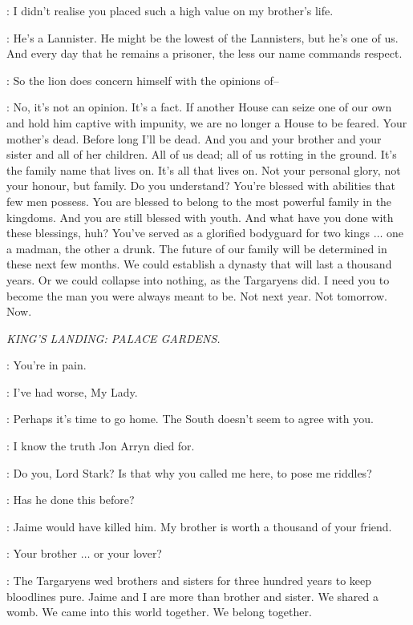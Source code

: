 \JAIME: I didn't realise you placed such a high value on my brother's life. 

\TYWIN: He's a Lannister. He might be the lowest of the Lannisters, but he's one of us. And every day that he remains a prisoner, the less our name commands respect. 

\JAIME: So the lion does concern himself with the opinions of-- 

\TYWIN: No, it's not an opinion. It's a fact. If another House can seize one of our own and hold him captive with impunity, we are no longer a House to be feared. Your mother's dead. Before long I'll be dead. And you and your brother and your sister and all of her children. All of us dead; all of us rotting in the ground. It's the family name that lives on. It's all that lives on. Not your personal glory, not your honour, but family. Do you understand? You're blessed with abilities that few men possess. You are blessed to belong to the most powerful family in the kingdoms. And you are still blessed with youth. And what have you done with these blessings, huh? You've served as a glorified bodyguard for two kings $\ldots$ one a madman, the other a drunk. The future of our family will be determined in these next few months. We could establish a dynasty that will last a thousand years. Or we could collapse into nothing, as the Targaryens did. I need you to become the man you were always meant to be. Not next year. Not tomorrow. Now. 


\scene

\textit{ KING'S LANDING: PALACE GARDENS.}


\CERSEI: You're in pain. 

\NED: I've had worse, My Lady. 

\CERSEI: Perhaps it's time to go home. The South doesn't seem to agree with you. 

\NED: I know the truth Jon Arryn died for. 

\CERSEI: Do you, Lord Stark? Is that why you called me here, to pose me riddles? 

\NED:  Has he done this before? 

\CERSEI: Jaime would have killed him. My brother is worth a thousand of your friend. 

\NED: Your brother $\ldots$ or your lover? 

\CERSEI: The Targaryens wed brothers and sisters for three hundred years to keep bloodlines pure. Jaime and I are more than brother and sister. We shared a womb. We came into this world together. We belong together. 

